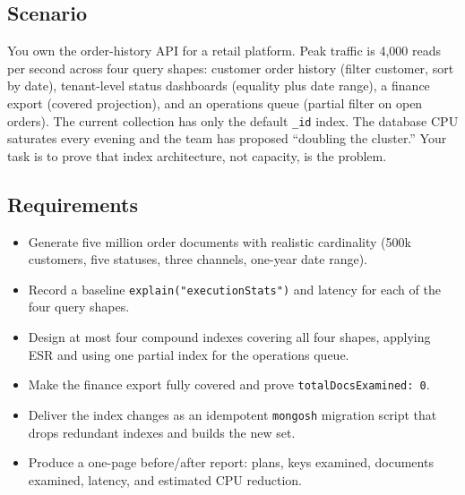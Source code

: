 \subsection*{Scenario}
You own the order-history API for a retail platform. Peak traffic is 4,000 reads per second across four query shapes: customer order history (filter customer, sort by date), tenant-level status dashboards (equality plus date range), a finance export (covered projection), and an operations queue (partial filter on open orders). The current collection has only the default \texttt{\_id} index. The database CPU saturates every evening and the team has proposed ``doubling the cluster.'' Your task is to prove that index architecture, not capacity, is the problem.

\subsection*{Requirements}
\begin{itemize}
    \item Generate five million order documents with realistic cardinality (500k customers, five statuses, three channels, one-year date range).
    \item Record a baseline \texttt{explain("executionStats")} and latency for each of the four query shapes.
    \item Design at most four compound indexes covering all four shapes, applying ESR and using one partial index for the operations queue.
    \item Make the finance export fully covered and prove \texttt{totalDocsExamined: 0}.
    \item Deliver the index changes as an idempotent \texttt{mongosh} migration script that drops redundant indexes and builds the new set.
    \item Produce a one-page before/after report: plans, keys examined, documents examined, latency, and estimated CPU reduction.
\end{itemize}

